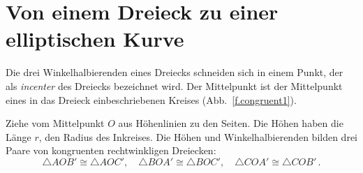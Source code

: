 \section{Von einem Dreieck zu einer elliptischen Kurve}\label{s.elliptic}

Die drei Winkelhalbierenden eines Dreiecks schneiden sich in einem Punkt, der als \emph{incenter} des Dreiecks bezeichnet wird. Der Mittelpunkt ist der Mittelpunkt eines in das Dreieck einbeschriebenen Kreises (Abb.~\ref{f.congruent1}). 

Ziehe vom Mittelpunkt $O$ aus Höhenlinien zu den Seiten. Die Höhen haben die Länge $r$, den Radius des Inkreises. Die Höhen und Winkelhalbierenden bilden drei Paare von kongruenten rechtwinkligen Dreiecken:
\[
\triangle AOB'\cong \triangle AOC',\quad \triangle BOA'\cong \triangle BOC',\quad \triangle COA'\cong \triangle COB'\,.
\]

